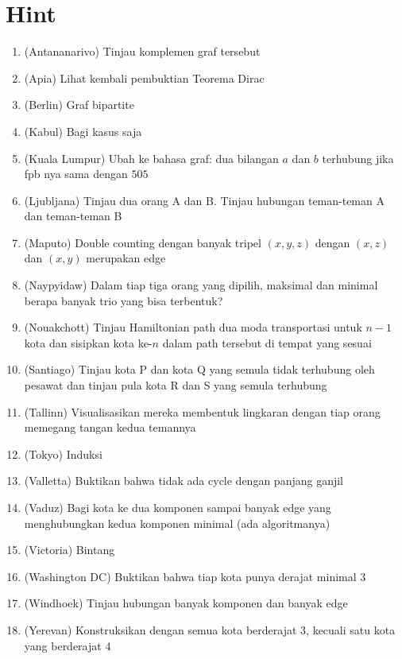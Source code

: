 \documentclass[11pt]{scrartcl}
\begin{document}
\section{Hint}
\begin{enumerate}
    \item (Antananarivo) Tinjau komplemen graf tersebut
    \item (Apia) Lihat kembali pembuktian Teorema Dirac
    \item (Berlin) Graf bipartite
    \item (Kabul) Bagi kasus saja
    \item (Kuala Lumpur) Ubah ke bahasa graf: dua bilangan $a$ dan $b$ terhubung jika fpb nya sama dengan $505$ 
    \item (Ljubljana) Tinjau dua orang A dan B. Tinjau hubungan teman-teman A dan teman-teman B
    \item (Maputo) Double counting dengan banyak tripel $(x, y, z)$ dengan $(x, z)$ dan $(x, y)$ merupakan edge
    \item (Naypyidaw) Dalam tiap tiga orang yang dipilih, maksimal dan minimal berapa banyak trio yang bisa terbentuk?
    \item (Nouakchott) Tinjau Hamiltonian path dua moda transportasi untuk $n - 1$ kota dan sisipkan kota ke-$n$ dalam path tersebut di tempat yang sesuai
    \item (Santiago) Tinjau kota P dan kota Q yang semula tidak terhubung oleh pesawat dan tinjau pula kota R dan S yang semula terhubung
    \item (Tallinn) Visualisasikan mereka membentuk lingkaran dengan tiap orang memegang tangan kedua temannya
    \item (Tokyo) Induksi
    \item (Valletta) Buktikan bahwa tidak ada cycle dengan panjang ganjil
    \item (Vaduz) Bagi kota ke dua komponen sampai banyak edge yang menghubungkan kedua komponen minimal (ada algoritmanya)
    \item (Victoria) Bintang
    \item (Washington DC) Buktikan bahwa tiap kota punya derajat minimal 3
    \item (Windhoek) Tinjau hubungan banyak komponen dan banyak edge
    \item (Yerevan) Konstruksikan dengan semua kota berderajat 3, kecuali satu kota yang berderajat 4
\end{enumerate}
\end{document}
